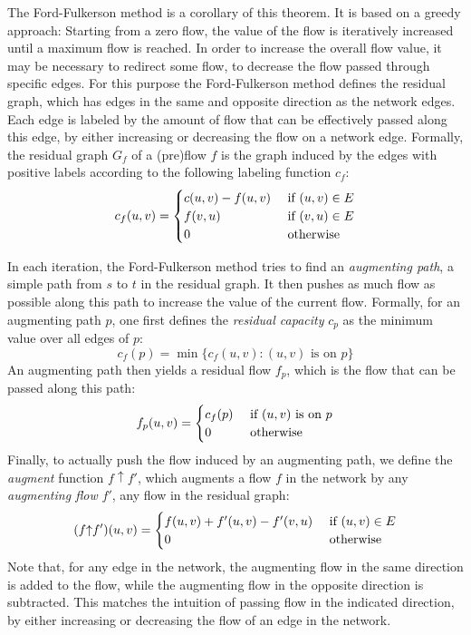 \documentclass[smallcondensed]{svjour3}     %
\begin{document}
The Ford-Fulkerson method is a corollary of this theorem. It is based on a greedy approach: Starting from a zero flow, the value of the flow is iteratively increased until a maximum flow is reached. In order to increase the overall flow value, it may be necessary to redirect some flow, \ie to decrease the flow passed through specific edges. For this purpose the Ford-Fulkerson method defines the residual graph, which has edges in the same and opposite direction as the network edges.
Each edge is labeled by the amount of flow that can be effectively passed along this edge, by either increasing or decreasing the flow on a network edge.
Formally, the residual graph $G_f$ of a (pre)flow $f$ is the graph induced by the 
edges with positive labels according to the following labeling function $c_f$:
\[ c_f (u, v) = 
  \begin{cases}
  c (u, v) - f(u, v) \hfill & \text{ if $(u, v) \in E$} \\
  f (v, u) \hfill & \text{ if $(v, u) \in E$} \\  
  0 \hfill & \text{ otherwise} \\
  \end{cases} 
\]

In each iteration, the Ford-Fulkerson method tries to find an \emph{augmenting path}, \ie a simple path from $s$ to $t$ in the residual graph.
It then pushes as much flow as possible along this path to increase the value of the current flow. 
Formally, for an augmenting path $p$, one first defines the \emph{residual capacity} $c_p$ as the minimum value over all edges of $p$:
\[c_f(p) = \min \{c_f(u, v): \text{$(u, v)$ is on  $p$}\}\]
An augmenting path then yields a residual flow $f_p$, which is the flow that can be passed along this path:
\[ f_p (u, v) = 
  \begin{cases}
  c_f(p) \hfill & \text{ if $(u, v)$ is on $p$} \\  
  0 \hfill & \text{ otherwise} \\
  \end{cases} 
\]
\newcommand{\augment}{{\mathbin\uparrow}}%
Finally, to actually push the flow induced by an augmenting path, we define the \emph{augment} function $f\augment f'$, which augments a flow $f$ in the network 
by any \emph{augmenting flow} $f'$, \ie any flow in the residual graph:
\[ (f \augment f') (u, v) = 
  \begin{cases}
  f (u, v) + f'(u, v) - f'(v, u) \hfill & \text{ if $(u, v) \in E$} \\  
  0 \hfill & \text{ otherwise} \\
  \end{cases} 
\]
Note that, for any edge in the network, the augmenting flow in the same direction is added to the flow, while the augmenting flow in the opposite direction is subtracted. 
This matches the intuition of passing flow in the indicated direction, by either increasing or decreasing the flow of an edge in the network.
\end{document}
